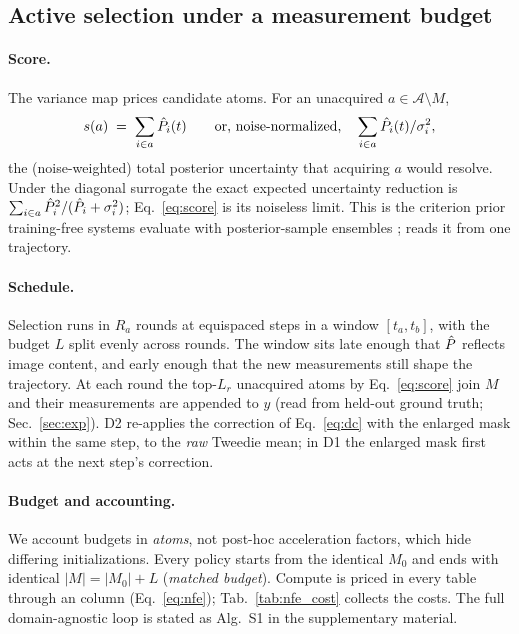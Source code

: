 \subsection{Active selection under a measurement budget}\label{sec:method_active}

\paragraph{Score.}
The variance map prices candidate atoms. For an unacquired
$a \in \mathcal{A} \setminus M$,
\begin{equation}
  s(a) \;=\; \sum_{i \in a} \hat{P}_i(t)
  \qquad \text{or, noise-normalized,} \quad
  \sum_{i \in a} \hat{P}_i(t)/\sigma_i^2 ,
  \label{eq:score}
\end{equation}
the (noise-weighted) total posterior uncertainty that acquiring $a$
would resolve. Under the diagonal surrogate the exact expected
uncertainty reduction is $\sum_{i \in a} \hat{P}_i^2/(\hat{P}_i + \sigma_i^2)$;
Eq.~\ref{eq:score} is its noiseless limit. This is the criterion prior
training-free systems evaluate with posterior-sample ensembles
\cite{elata2024adasense,nolan2025ads,barba2025dal,iollo2025bedmri,gu2025gsc};
\pvas{} reads it from one trajectory.

\paragraph{Schedule.}
Selection runs in $R_a$ rounds at equispaced steps in a window
$[t_a, t_b]$, with the budget $L$ split evenly across rounds. The window
sits late enough that $\hat{P}$ reflects image content, and early enough
that the new measurements still shape the trajectory. At each round the
top-$L_r$ unacquired atoms by Eq.~\ref{eq:score} join $M$ and their
measurements are appended to $y$ (read from held-out ground truth;
Sec.~\ref{sec:exp}). D2 re-applies the correction of Eq.~\ref{eq:dc}
with the enlarged mask within the same step, to the \emph{raw} Tweedie
mean; in D1 the enlarged mask first acts at the next step's correction.

\paragraph{Budget and \nfe{} accounting.}
We account budgets in \emph{atoms}, not post-hoc acceleration factors,
which hide differing initializations. Every policy starts from the
identical $M_0$ and ends with identical $|M| = |M_0| + L$ (\emph{matched
budget}). Compute is priced in every table through an \nfe{} column
(Eq.~\ref{eq:nfe}); Tab.~\ref{tab:nfe_cost} collects the costs. The full
domain-agnostic loop is stated as Alg.~S1 in the supplementary material.

